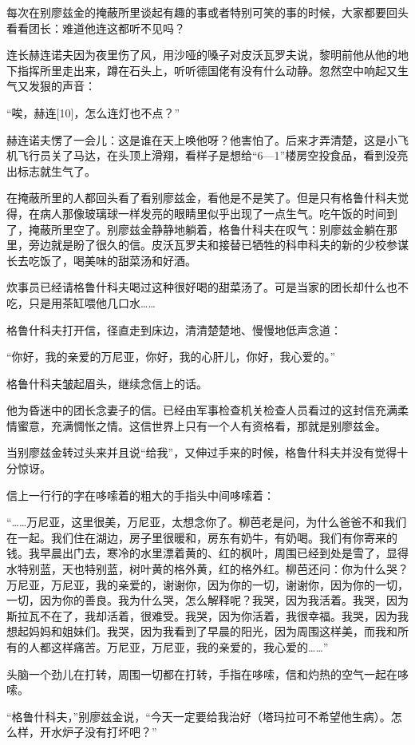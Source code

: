 每次在别廖兹金的掩蔽所里谈起有趣的事或者特别可笑的事的时候，大家都要回头看看团长：难道他连这都听不见吗？

连长赫连诺夫因为夜里伤了风，用沙哑的嗓子对皮沃瓦罗夫说，黎明前他从他的地下指挥所里走出来，蹲在石头上，听听德国佬有没有什么动静。忽然空中响起又生气又发狠的声音：

“唉，赫连[10]，怎么连灯也不点？”

赫连诺夫愣了一会儿：这是谁在天上唤他呀？他害怕了。后来才弄清楚，这是小飞机飞行员关了马达，在头顶上滑翔，看样子是想给“6—1”楼房空投食品，看到没亮出标志就生气了。

在掩蔽所里的人都回头看了看别廖兹金，看他是不是笑了。但是只有格鲁什科夫觉得，在病人那像玻璃球一样发亮的眼睛里似乎出现了一点生气。吃午饭的时间到了，掩蔽所里空了。别廖兹金静静地躺着，格鲁什科夫在叹气：别廖兹金躺在那里，旁边就是盼了很久的信。皮沃瓦罗夫和接替已牺牲的科申科夫的新的少校参谋长去吃饭了，喝美味的甜菜汤和好酒。

炊事员已经请格鲁什科夫喝过这种很好喝的甜菜汤了。可是当家的团长却什么也不吃，只是用茶缸喂他几口水……

格鲁什科夫打开信，径直走到床边，清清楚楚地、慢慢地低声念道：

“你好，我的亲爱的万尼亚，你好，我的心肝儿，你好，我心爱的。”

格鲁什科夫皱起眉头，继续念信上的话。

他为昏迷中的团长念妻子的信。已经由军事检查机关检查人员看过的这封信充满柔情蜜意，充满惆怅之情。这信世界上只有一个人有资格看，那就是别廖兹金。

当别廖兹金转过头来并且说“给我”，又伸过手来的时候，格鲁什科夫并没有觉得十分惊讶。

信上一行行的字在哆嗦着的粗大的手指头中间哆嗦着：

“……万尼亚，这里很美，万尼亚，太想念你了。柳芭老是问，为什么爸爸不和我们在一起。我们住在湖边，房子里很暖和，房东有奶牛，有奶喝。我们有你寄来的钱。我早晨出门去，寒冷的水里漂着黄的、红的枫叶，周围已经到处是雪了，显得水特别蓝，天也特别蓝，树叶黄的格外黄，红的格外红。柳芭还问：你为什么哭？万尼亚，万尼亚，我的亲爱的，谢谢你，因为你的一切，谢谢你，因为你的一切，一切，因为你的善良。我为什么哭，怎么解释呢？我哭，因为我活着。我哭，因为斯拉瓦不在了，我却活着，很难受。我哭，因为你活着，我很幸福。我哭，因为我想起妈妈和姐妹们。我哭，因为我看到了早晨的阳光，因为周围这样美，而我和所有的人都这样痛苦。万尼亚，万尼亚，我的亲爱的，我心爱的……”

头脑一个劲儿在打转，周围一切都在打转，手指在哆嗦，信和灼热的空气一起在哆嗦。

“格鲁什科夫，”别廖兹金说，“今天一定要给我治好（塔玛拉可不希望他生病）。怎么样，开水炉子没有打坏吧？”

